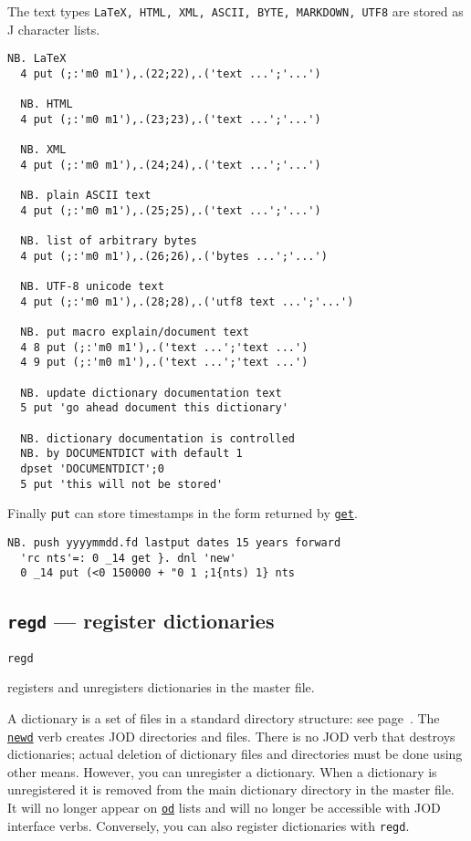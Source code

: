 The text types \texttt{LaTeX, HTML, XML, ASCII, BYTE, MARKDOWN, UTF8}
are stored as J character lists. 

\begin{lstlisting}[frame=single,framerule=0pt]   
  NB. LaTeX 
  4 put (;:'m0 m1'),.(22;22),.('text ...';'...') 
  
  NB. HTML 
  4 put (;:'m0 m1'),.(23;23),.('text ...';'...') 

  NB. XML 
  4 put (;:'m0 m1'),.(24;24),.('text ...';'...') 
  
  NB. plain ASCII text 
  4 put (;:'m0 m1'),.(25;25),.('text ...';'...') 
  
  NB. list of arbitrary bytes
  4 put (;:'m0 m1'),.(26;26),.('bytes ...';'...') 
  
  NB. UTF-8 unicode text 
  4 put (;:'m0 m1'),.(28;28),.('utf8 text ...';'...') 

  NB. put macro explain/document text
  4 8 put (;:'m0 m1'),.('text ...';'text ...')
  4 9 put (;:'m0 m1'),.('text ...';'text ...') 
  
  NB. update dictionary documentation text
  5 put 'go ahead document this dictionary'
  
  NB. dictionary documentation is controlled 
  NB. by DOCUMENTDICT with default 1
  dpset 'DOCUMENTDICT';0
  5 put 'this will not be stored' 
\end{lstlisting}
  
Finally \texttt{put} can store timestamps in the form returned by \hyperlink{il:get}{\texttt{get}}.

\begin{lstlisting}[frame=single,framerule=0pt]  
  NB. push yyyymmdd.fd lastput dates 15 years forward
  'rc nts'=: 0 _14 get }. dnl 'new'
  0 _14 put (<0 150000 + "0 1 ;1{nts) 1} nts 
\end{lstlisting}                  


\subsection{\texttt{regd} --- register dictionaries}\label{ss:regd}

\hypertarget{il:regd}{\texttt{regd}} registers and unregisters 
 dictionaries in the master file.
 
 A dictionary is a set of files in a standard directory structure: see page~\pageref{ss:joddirs}. 
 The \hyperlink{il:newd}{\texttt{newd}} verb creates JOD directories and files.
  There is no JOD verb that destroys dictionaries; actual 
  deletion of dictionary files and directories must be done using 
  other means. However, you can unregister a dictionary. 
  When a dictionary is unregistered it is removed from the main 
  dictionary directory in the master file. It will no longer appear 
  on \hyperlink{il:od}{\texttt{od}} lists and will no longer be accessible with JOD interface verbs. 
  Conversely, you can also register dictionaries with \texttt{regd}. 

